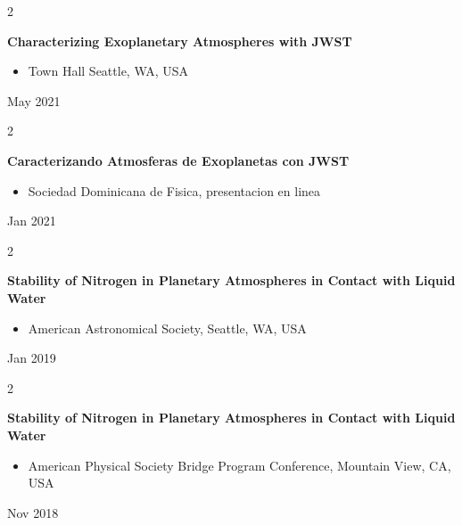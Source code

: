 \documentclass[10pt, letterpaper]{article}
\newenvironment{highlights}{
    \begin{itemize}[
        topsep=0.10 cm,
        parsep=0.10 cm,
        partopsep=0pt,
        itemsep=0pt,
        leftmargin=0.4 cm + 10pt
    ]
}{
    \end{itemize}
} %
\newenvironment{twocolentry}[2][]{
    \onecolentry
    \def\secondColumn{#2}
    \setcolumnwidth{\fill, 4.5 cm}
    \begin{paracol}{2}
}{
    \switchcolumn \raggedleft \secondColumn
    \end{paracol}
    \endonecolentry
} %
\begin{document}
        \vspace{0.2 cm}

        \begin{twocolentry}{
            May 2021
        }
            \textbf{Characterizing Exoplanetary Atmospheres with JWST}
            \begin{highlights}
                \item Town Hall Seattle, WA, USA
            \end{highlights}
        \end{twocolentry}


        \vspace{0.2 cm}

        \begin{twocolentry}{
            Jan 2021
        }
            \textbf{Caracterizando Atmosferas de Exoplanetas con JWST}
            \begin{highlights}
                \item Sociedad Dominicana de Fisica, presentacion en linea
            \end{highlights}
        \end{twocolentry}


        \vspace{0.2 cm}

        \begin{twocolentry}{
            Jan 2019
        }
            \textbf{Stability of Nitrogen in Planetary Atmospheres in Contact with Liquid Water}
            \begin{highlights}
                \item American Astronomical Society, Seattle, WA, USA
            \end{highlights}
        \end{twocolentry}


        \vspace{0.2 cm}

        \begin{twocolentry}{
            Nov 2018
        }
            \textbf{Stability of Nitrogen in Planetary Atmospheres in Contact with Liquid Water}
            \begin{highlights}
                \item American Physical Society Bridge Program Conference, Mountain View, CA, USA
            \end{highlights}
        \end{twocolentry}
\end{document}
